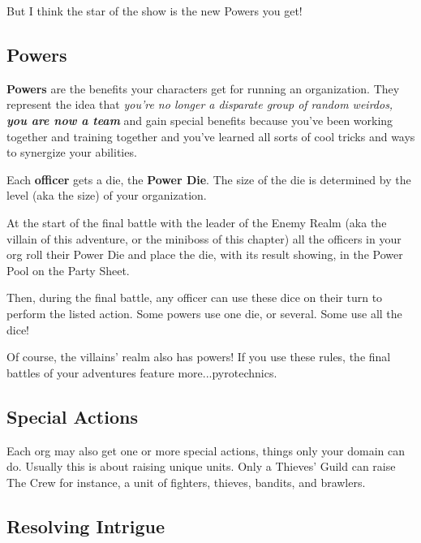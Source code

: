 \documentclass[letterpaper,twocolumn,openany,nodeprecatedcode]{dndbook}
\begin{document}
But I think the star of the show is the new Powers you get!

\subsection{Powers}

\textbf{Powers} are the benefits your characters get for running an organization.
They represent the idea that \textit{you’re no longer a disparate group of random weirdos, \textbf{you are now a team}} and gain special benefits because you’ve been working together and training together and you’ve learned all sorts of cool tricks and ways to synergize your abilities.


Each \textbf{officer} gets a die, the \textbf{Power Die}.
The size of the die is determined by the level (aka the size) of your organization.

At the start of the final battle with the leader of the Enemy Realm (aka the villain of this adventure, or the miniboss of this chapter) all the officers in your org roll their Power Die and place the die, with its result showing, in the Power Pool on the Party Sheet.

Then, during the final battle, any officer can use these dice on their turn to perform the listed action.
Some powers use one die, or several.
Some use all the dice!

Of course, the villains’ realm also has powers!
If you use these rules, the final battles of your adventures feature more...pyrotechnics.

\subsection{Special Actions}

Each org may also get one or more special actions, things only your domain can do.
Usually this is about raising unique units.
Only a Thieves’ Guild can raise The Crew for instance, a unit of fighters, thieves, bandits, and brawlers.

\subsection{Resolving Intrigue}
\end{document}
